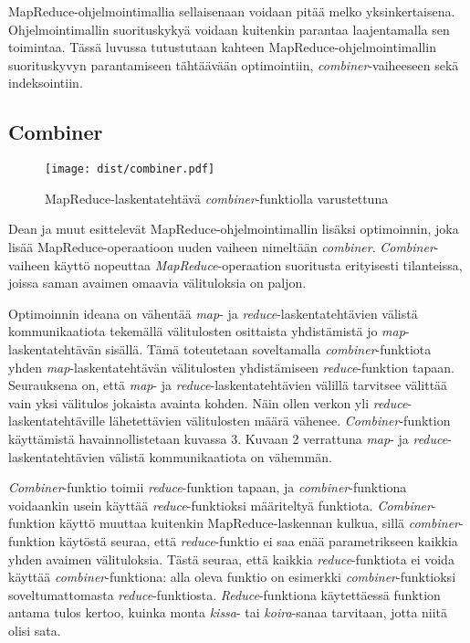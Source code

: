 \documentclass[finnish]{templates/tktltiki2}
\theoremstyle{definition}
\theoremstyle{remark}
\begin{document}
MapReduce-ohjelmointimallia sellaisenaan voidaan pitää melko
yksinkertaisena. Ohjelmointimallin suorituskykyä voidaan kuitenkin
parantaa laajentamalla sen toimintaa. Tässä luvussa tutustutaan kahteen
MapReduce-ohjelmointimallin suorituskyvyn parantamiseen tähtäävään
optimointiin, \emph{combiner}-vaiheeseen sekä indeksointiin.

\subsection{Combiner}\label{combiner}

\begin{figure}[!b]
\centering
\texttt{[image: dist/combiner.pdf]}
\caption{MapReduce-laskentatehtävä \emph{combiner}-funktiolla
varustettuna}
\end{figure}

Dean ja muut \cite{mapreduce} esittelevät
MapReduce-ohjelmointimallin lisäksi optimoinnin, joka lisää
MapReduce-operaatioon uuden vaiheen nimeltään \emph{combiner}.
\emph{Combiner}-vaiheen käyttö nopeuttaa \emph{MapReduce}-operaation
suoritusta erityisesti tilanteissa, joissa saman avaimen omaavia
välituloksia on paljon.

Optimoinnin ideana on vähentää \emph{map}- ja
\emph{reduce}-laskentatehtävien välistä kommunikaatiota tekemällä
välitulosten osittaista yhdistämistä jo \emph{map}-laskentatehtävän
sisällä. Tämä toteutetaan soveltamalla \emph{combiner}-funktiota yhden
\emph{map}-laskentatehtävän välitulosten yhdistämiseen
\emph{reduce}-funktion tapaan. Seurauksena on, että \emph{map}- ja
\emph{reduce}-laskentatehtävien välillä tarvitsee välittää vain yksi
välitulos jokaista avainta kohden. Näin ollen verkon yli
\emph{reduce}-laskentatehtäville lähetettävien välitulosten määrä
vähenee. \emph{Combiner}-funktion käyttämistä havainnollistetaan kuvassa
3. Kuvaan 2 verrattuna \emph{map}- ja \emph{reduce}-laskentatehtävien
välistä kommunikaatiota on vähemmän.

\emph{Combiner}-funktio toimii \emph{reduce}-funktion tapaan, ja
\emph{combiner}-funktiona voidaankin usein käyttää
\emph{reduce}-funktioksi määriteltyä funktiota. \emph{Combiner}-funktion
käyttö muuttaa kuitenkin MapReduce-laskennan kulkua, sillä
\emph{combiner}-funktion käytöstä seuraa, että \emph{reduce}-funktio ei
saa enää parametrikseen kaikkia yhden avaimen välituloksia. Tästä
seuraa, että kaikkia \emph{reduce}-funktiota ei voida käyttää
\emph{combiner}-funktiona: alla oleva funktio on esimerkki
\emph{combiner}-funktioksi soveltumattomasta \emph{reduce}-funktiosta.
\emph{Reduce}-funktiona käytettäessä funktion antama tulos kertoo,
kuinka monta \emph{kissa}- tai \emph{koira}-sanaa tarvitaan, jotta niitä
olisi sata.
\end{document}
